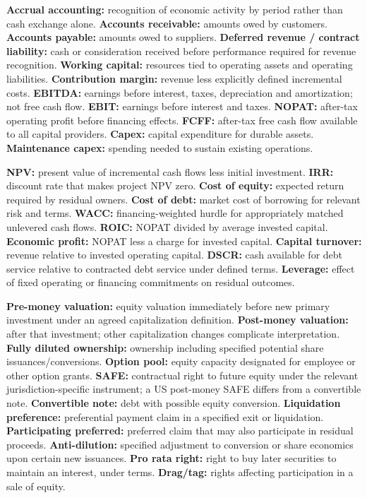 \textbf{Accrual accounting:} recognition of economic activity by period rather than cash exchange alone. \textbf{Accounts receivable:} amounts owed by customers. \textbf{Accounts payable:} amounts owed to suppliers. \textbf{Deferred revenue / contract liability:} cash or consideration received before performance required for revenue recognition. \textbf{Working capital:} resources tied to operating assets and operating liabilities. \textbf{Contribution margin:} revenue less explicitly defined incremental costs. \textbf{EBITDA:} earnings before interest, taxes, depreciation and amortization; not free cash flow. \textbf{EBIT:} earnings before interest and taxes. \textbf{NOPAT:} after-tax operating profit before financing effects. \textbf{FCFF:} after-tax free cash flow available to all capital providers. \textbf{Capex:} capital expenditure for durable assets. \textbf{Maintenance capex:} spending needed to sustain existing operations.

\textbf{NPV:} present value of incremental cash flows less initial investment. \textbf{IRR:} discount rate that makes project NPV zero. \textbf{Cost of equity:} expected return required by residual owners. \textbf{Cost of debt:} market cost of borrowing for relevant risk and terms. \textbf{WACC:} financing-weighted hurdle for appropriately matched unlevered cash flows. \textbf{ROIC:} NOPAT divided by average invested capital. \textbf{Economic profit:} NOPAT less a charge for invested capital. \textbf{Capital turnover:} revenue relative to invested operating capital. \textbf{DSCR:} cash available for debt service relative to contracted debt service under defined terms. \textbf{Leverage:} effect of fixed operating or financing commitments on residual outcomes.

\textbf{Pre-money valuation:} equity valuation immediately before new primary investment under an agreed capitalization definition. \textbf{Post-money valuation:} after that investment; other capitalization changes complicate interpretation. \textbf{Fully diluted ownership:} ownership including specified potential share issuances/conversions. \textbf{Option pool:} equity capacity designated for employee or other option grants. \textbf{SAFE:} contractual right to future equity under the relevant jurisdiction-specific instrument; a US post-money SAFE differs from a convertible note. \textbf{Convertible note:} debt with possible equity conversion. \textbf{Liquidation preference:} preferential payment claim in a specified exit or liquidation. \textbf{Participating preferred:} preferred claim that may also participate in residual proceeds. \textbf{Anti-dilution:} specified adjustment to conversion or share economics upon certain new issuances. \textbf{Pro rata right:} right to buy later securities to maintain an interest, under terms. \textbf{Drag/tag:} rights affecting participation in a sale of equity.

